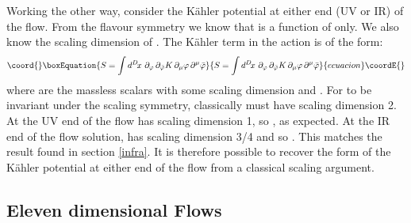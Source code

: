 \documentclass[a4paper,12pt]{article}
\providecommand{\labell}[1]{\label{#1}}
\begin{document}
Working the other way, consider the K\"ahler potential at either end
(UV or IR) of the flow.  From the \coordHE{} flavour symmetry we know
that \coordHE{} is a function of \coordHE{} only.  We also know the scaling
dimension of \coordHE{}.  The K\"ahler term in the action is of the form:
\begin{equation}\coord{}\boxEquation{
  S = \int d^D\! x \,\, \partial_\varphi \, \partial_{\bar{\varphi}} K \, \partial_\mu \varphi \, \partial^\mu \bar{\varphi}
  \labell{Kaction}
}{
  S = \int d^D\! x \,\, \partial_\varphi \, \partial_{\bar{\varphi}} K \, \partial_\mu \varphi \, \partial^\mu \bar{\varphi}
  \labell{Kaction}
}{ecuacion}\coordE{}\end{equation}
where \myHighlight{$\varphi$}\coordHE{} are the massless scalars with some scaling dimension
and \coordHE{}.  For \coordHE{} to be invariant under the scaling symmetry,
classically \coordHE{} must have scaling dimension 2.  At the UV end of
the flow \coordHE{} has scaling dimension 1, so \coordHE{}, as expected.
At the IR end of the flow solution, \coordHE{} has scaling dimension 3/4 and
so \coordHE{}.  This matches the result found in section
\ref{infra}.  It is therefore possible to recover the form of the
K\"ahler potential at either end of the flow from a classical scaling
argument.


\subsection{Eleven dimensional \coordHE{} Flows}
\label{scaling-11d}
\end{document}

